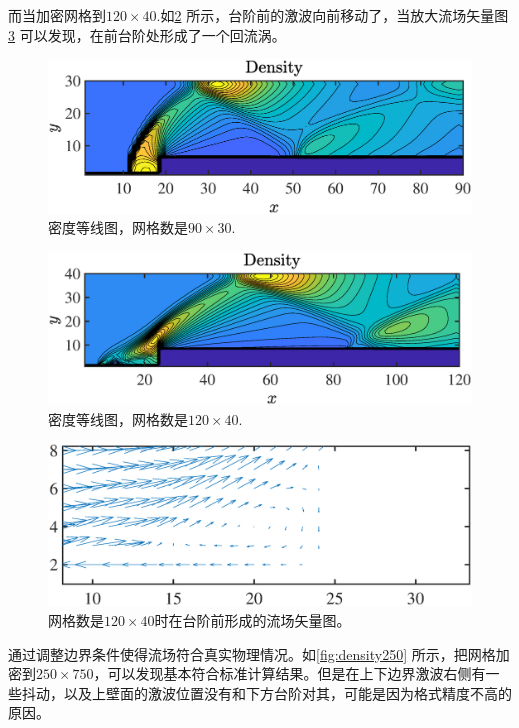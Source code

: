 \documentclass[12pt]{article}
\begin{document}
而当加密网格到$120\times 40$.如\cref{fig:density40} 所示，台阶前的激波向前移动了，当放大流场矢量图\cref{fig:eddy}  可以发现，在前台阶处形成了一个回流涡。


\begin{figure}[htp]
	\centering
	\includegraphics[width=15cm]{density30.eps}
	\caption{密度等线图，网格数是$90\times 30$.}
	\label{fig:density30}
\end{figure}

\begin{figure}[htp]
	\centering
	\includegraphics[width=15cm]{density40.eps}
	\caption{密度等线图，网格数是$120\times 40$.}
	\label{fig:density40}
\end{figure}

\begin{figure}[htp]
	\centering
	\includegraphics[width=15cm]{eddy.eps}
	\caption{网格数是$120\times 40$时在台阶前形成的流场矢量图。}
	\label{fig:eddy}
\end{figure}

通过调整边界条件使得流场符合真实物理情况。如\cref{fig:density250} 所示，把网格加密到$250\times 750$，可以发现基本符合标准计算结果。但是在上下边界激波右侧有一些抖动，以及上壁面的激波位置没有和下方台阶对其，可能是因为格式精度不高的原因。
\end{document}
